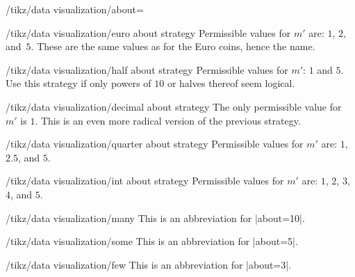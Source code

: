 \begin{key}{/tikz/data visualization/about=}
    \begin{key}{/tikz/data visualization/euro about strategy}
        Permissible values for $m'$ are: $1$, $2$, and~$5$. These are the same values as for the Euro coins, hence the name.

    \end{key}

    \begin{key}{/tikz/data visualization/half about strategy}
        Permissible values for $m'$: $1$ and $5$. Use this strategy if only powers of $10$ or halves thereof seem logical.

    \end{key}

    \begin{key}{/tikz/data visualization/decimal about strategy}
        The only permissible value for $m'$ is $1$. This is an even more radical version of the previous strategy.

    \end{key}

    \begin{key}{/tikz/data visualization/quarter about strategy}
        Permissible values for $m'$ are: $1$, $2.5$, and $5$.

    \end{key}

    \begin{key}{/tikz/data visualization/int about strategy}
        Permissible values for $m'$ are: $1$, $2$, $3$, $4$, and $5$.

    \end{key}
\end{key}

\begin{key}{/tikz/data visualization/many}
    This is an abbreviation for |about=10|.
\end{key}

\begin{key}{/tikz/data visualization/some}
    This is an abbreviation for |about=5|.
\end{key}

\begin{key}{/tikz/data visualization/few}
    This is an abbreviation for |about=3|.
\end{key}

